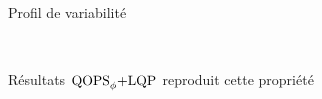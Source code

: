 \begin{frame}{Profil de variabilité}
    \begin{figure}
        \centering
        ~~~
    \end{figure}
    \begin{block}{Résultats}
        $\text{QOPS}_\phi\text{+LQP}$ reproduit cette propriété
    \end{block}
\end{frame}

